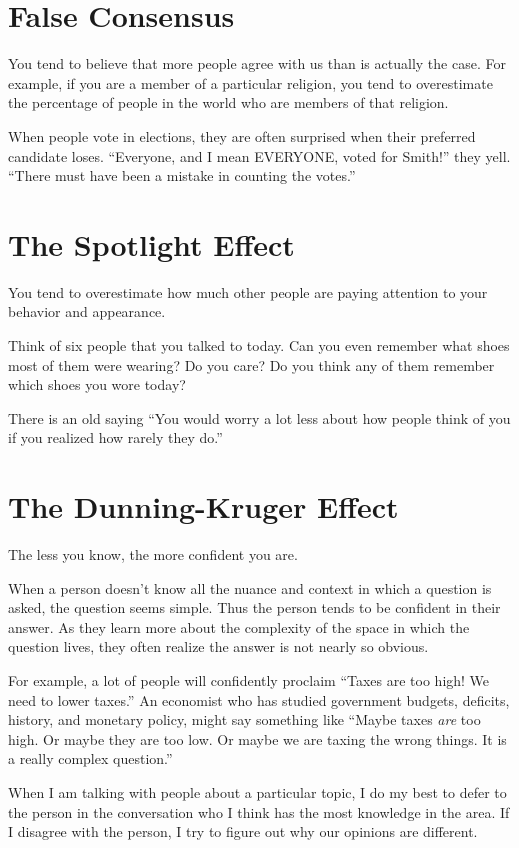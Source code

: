 \section{False Consensus}

You tend to believe that more people agree with us than is actually
the case. For example, if you are a member of a particular religion,
you tend to overestimate the percentage of people in the world who are
members of that religion.

When people vote in elections, they are often surprised when their
preferred candidate loses. ``Everyone, and I mean EVERYONE, voted for
Smith!'' they yell.  ``There must have been a mistake in counting the
votes.''

\section{The Spotlight Effect}

You tend to overestimate how much other people are paying attention to
your behavior and appearance.

Think of six people that you talked to today.  Can you even remember what
shoes most of them were wearing? Do you care? Do you think any of them
remember which shoes you wore today?

There is an old saying ``You would worry a lot less about how people
think of you if you realized how rarely they do.''

\section{The Dunning-Kruger Effect}

The less you know, the more confident you are.

When a person doesn't know all the nuance and context in which a question is
asked, the question seems simple. Thus the person tends to be confident in
their answer.  As they learn more about the complexity of the space in
which the question lives, they often realize the answer is not nearly so
obvious.

For example, a lot of people will confidently proclaim ``Taxes are too
high! We need to lower taxes.''  An economist who has studied
government budgets, deficits, history, and monetary policy, might say
something like ``Maybe taxes \emph{are} too high.  Or maybe they are
too low. Or maybe we are taxing the wrong things. It is a really
complex question.''

When I am talking with people about a particular topic, I do my best
to defer to the person in the conversation who I think has the most
knowledge in the area. If I disagree with the person, I try to figure
out why our opinions are different.

